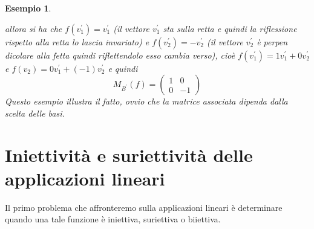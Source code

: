 \documentclass{book}
\newtheorem{esempio}{Esempio}
\begin{document}
\begin{esempio}
\begin{enumerate}
\begin{figure}[th]
    \end{figure}
    allora si ha che $f(v_1^\prime)=v_1^\prime$ (il vettore $v_1^\prime$ sta sulla retta e quindi
    la riflessione rispetto alla retta lo lascia invariato) e $f(v^\prime_2)=-v^\prime_2$ (il
    vettore $v_2^\prime$ è perpen dicolare alla fetta quindi riflettendolo esso cambia verso),
    cioè $f(v_1^\prime)=1v^\prime_1+0v^\prime_2$ e $f(v_2)=0v_1^\prime+(-1)v_2^\prime$ e quindi
     \begin{equation*}
      M_{B^\prime}(f)=
      \begin{pmatrix}
        1 & 0\\
        0 & -1
      \end{pmatrix}
    \end{equation*}
    Questo esempio illustra il fatto, ovvio che la matrice associata dipenda dalla scelta delle
    basi.
  \end{enumerate}
\end{esempio}

\section{Iniettività e suriettività delle applicazioni lineari}
\label{sec:inie_surie_app_lin}
Il primo problema che affronteremo sulla applicazioni lineari è determinare quando una tale
funzione è iniettiva, suriettiva o biiettiva.
\end{document}
